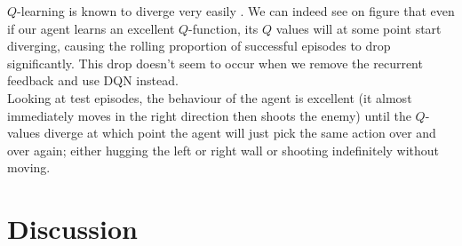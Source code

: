 \documentclass[letterpaper]{article}
\begin{document}
$Q$-learning is known to diverge very easily . We can indeed see 
on figure  that
even if our agent learns an excellent $Q$-function, its $Q$ values will at some
point start diverging, causing the rolling proportion of successful episodes
to drop significantly. This drop doesn't seem to occur when we remove the
recurrent feedback and use DQN instead.\\

Looking at test episodes, the behaviour of the agent is excellent (it almost
immediately moves in the right direction then shoots the enemy) until the 
$Q$-values diverge at which point the agent will just pick the same action
over and over again; either hugging the left or right wall or shooting 
indefinitely without moving.\\
\section{Discussion}


\footnotesize


\end{document}
